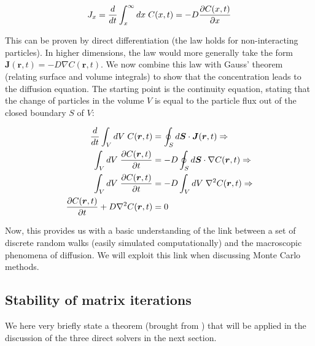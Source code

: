 \documentclass[a4paper, 11pt, notitlepage,english]{article}
\begin{document}
\begin{equation}
J_x = \frac{d}{dt} \int_x^{\infty} dx \hspace{1mm} C(x,t) = -D \frac{\partial C(x,t)}{\partial x}
\label{eq:Fick_law}
\end{equation}

This can be proven by direct differentiation (the law holds for non-interacting particles). In higher dimensions, the law would more generally take the form $\boldsymbol{J}(\boldsymbol{r},t) = - D \nabla C(\boldsymbol{r},t)$. We now combine this law with Gauss' theorem (relating surface and volume integrals) to show that the concentration leads to the diffusion equation. The starting point is the continuity equation, stating that the change of particles in the volume $V$ is equal to the particle flux out of the closed boundary $S$ of $V$:

\begin{align}
 \frac{d}{dt} \int_V dV \hspace{1mm} C(\boldsymbol{r},t) &= \oint_S d\boldsymbol{S} \cdot \boldsymbol{J}(\boldsymbol{r},t) \Rightarrow \\
 \int_V dV \hspace{1mm} \frac{\partial C(\boldsymbol{r},t)}{\partial t} &= -D\oint_S d\boldsymbol{S} \cdot \nabla C(\boldsymbol{r},t) \Rightarrow \\
  \int_V dV \hspace{1mm} \frac{\partial C(\boldsymbol{r},t)}{\partial t} &= -D\int_V dV \hspace{1mm} \nabla^2 C(\boldsymbol{r},t) \Rightarrow  \\
  \frac{\partial C(\boldsymbol{r},t)}{\partial t} + D \nabla^2 C(\boldsymbol{r},t) &= 0
\label{eq:Diffusion_Gauss_theorem}
\end{align}

Now, this provides us with a basic understanding of the link between a set of  discrete random walks (easily simulated computationally) and the macroscopic phenomena of diffusion. We will exploit this link when discussing Monte Carlo methods.


\subsection{Stability of matrix iterations}
\label{sec:Stability}
We here very briefly state a theorem (brought from \cite{Komp3150}) that will be applied in the discussion of the three direct solvers in the next section. \\
\end{document}
